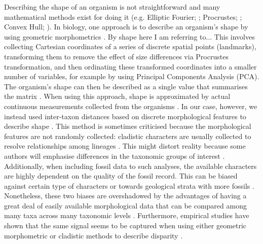Describing the shape of an organism is not straightforward and many mathematical methods exist for doing it (e.g. Elliptic Fourier; \citealt{Fourier1982}; Procrustes; \citealt{JamesRohlf1993129}; Convex Hull; \citealt{ANDREW1979216}).
In biology, one approach is to describe an organism's shape by using geometric morphometrics \citep{zelditch2012geometric}.
By shape here I am referring to... %
This involves collecting Cartesian coordinates of a series of discrete spatial points (landmarks), transforming them to remove the effect of size differences via Procrustes transformation, and then ordinating these transformed coordinates into a smaller number of variables, for example by using Principal Components Analysis (PCA).
The organism's shape can then be described as a single value that summarises the matrix \citep[e.g. the sum of the ranges of each PCA axis;][]{zelditch2012geometric}. %
When using this approach, shape is approximated by actual continuous measurements collected from the organisms \citep[e.g.][]{friedmanexplosive2010,hopkinsdecoupling2013,finlay2015morphological}.  %
In our case, however, we instead used inter-taxon distances based on discrete morphological features to describe shape \citep[i.e. the cladistic disparity method; e.g.][]{foote1997evolution,Wills2001,Wesley-Hunt2005}.
This method is sometimes criticised because the morphological features are not randomly collected: cladistic characters are usually collected to resolve relationships among lineages \citep{O'Leary08022013}.
This might distort reality because some authors will emphasise differences in the taxonomic groups of interest \citep{Hopkins24032015}.
Additionally, when including fossil data to such analyses, the available characters are highly dependent on the quality of the fossil record.
This can be biased against certain type of characters \citep[e.g. soft tissues;][]{sansomfossilization2013} or towards geological strata with more fossils \citep[e.g. \textit{Lagerst\"{a}tten};][]{Butler2012}.
Nonetheless, these two biases are overshadowed by the advantages of having a great deal of easily available morphological data \citep[some morphological matrices have more than 1000 characters; e.g.][]{O'Leary08022013,ni2013oldest} that can be compared among many taxa across many taxonomic levels \citep[e.g. across all mammals;][]{O'Leary08022013,Slater2012MEE,beckancient2014}.
Furthermore, empirical studies have shown that the same signal seems to be captured when using either geometric morphometric or cladistic methods to describe disparity \citep{foth2012different,hetherington2015cladistic}. 

